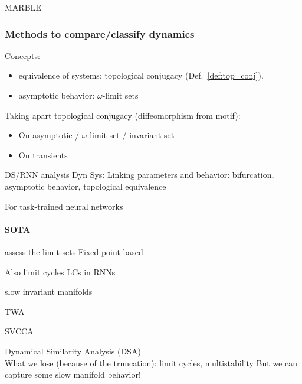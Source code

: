 \documentclass{article}
\theoremstyle{definition} \newtheorem{definition}{Definition}  \newtheorem{example}{Example}
\theoremstyle{remark} \newtheorem{remark}{Remark}
\newcounter{ct}
\begin{document}
MARBLE \citep{gosztolai2025marble}


\subsubsection{Methods to compare/classify dynamics}\label{sec:compare}
Concepts:
\begin{itemize}
\item equivalence of systems: topological conjugacy (Def.~\ref{def:top_conj}).%
\item asymptotic behavior: $\omega$-limit sets
\end{itemize}

Taking apart topological conjugacy (diffeomorphism from motif):
\begin{itemize}
\item On asymptotic / $\omega$-limit set / invariant set
\item On transients \citep{koch2024biological}
\end{itemize}


DS/RNN analysis
Dyn Sys: Linking parameters and behavior: bifurcation, asymptotic behavior,  topological equivalence \citep{beer1995ctrnn, beer2006parameterspace}

For task-trained neural networks
\citep{huang2024measuring}


\paragraph{SOTA}
\citep{mezic2004comparison}

assess the limit sets
Fixed-point based \citep{sussillo2013blackbox,katz2017fibers,golub2018fixedpointfinder}

Also limit cycles 
LCs in RNNs \citep{townley2000existence} \citep{pals2024inferring}

slow invariant manifolds\citep{Sagodi2024a}

TWA\citep{moriel2024timewarpattend}

SVCCA\citep{raghu2017svcca}

Dynamical Similarity Analysis (DSA) \citep{ostrow2024beyond} \citep{kamiya2024koopman}\\
What we lose (because of the truncation): limit cycles, multistability
But we can capture some slow manifold behavior!

\citep{lipshutz2024disentangling} 
\citep{nejatbakhsh2024comparing}
\citep{barbosa2025quantifying}
\end{document}
